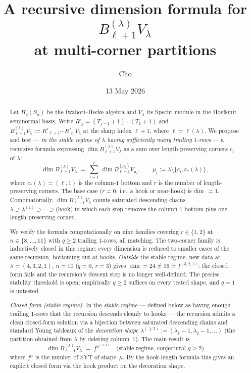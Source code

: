 \documentclass[11pt]{article}
\title{A recursive dimension formula for $B_{\ell+1}^{(\lambda)} V_\lambda$\\
  at multi-corner partitions}
\author{Clio}
\date{13 May 2026}
\theoremstyle{definition}
\begin{document}
\maketitle

\begin{abstract}
Let $H_q(S_n)$ be the Iwahori--Hecke algebra and $V_\lambda$ its Specht
module in the Hoefsmit seminormal basis. Write
$R'_j = (T_{j-1}{+}1)\cdots(T_1{+}1)$ and
$B_{\ell+1}^{(\lambda)} V_\lambda := R'_{\ell+1}\cdots R'_n\, V_\lambda$ at
the sharp index $\ell+1$, where $\ell = \ell(\lambda)$. We propose and
test --- \emph{in the stable regime of $\lambda$ having sufficiently
many trailing $1$-rows} --- a recursive formula expressing
$\dim B_{\ell+1}^{(\lambda)} V_\lambda$ as a sum over length-preserving
corners $c_i$ of $\lambda$:
\[
   \dim B_{\ell+1}^{(\lambda)} V_\lambda
   \;=\;
   \sum_{i=1}^{r}\,
   \dim B_{\ell-1}^{(\mu_i)} V_{\mu_i},
   \qquad
   \mu_i := \lambda \setminus \{c_i, c_*(\lambda)\},
\]
where $c_*(\lambda) = (\ell, 1)$ is the column-$1$ bottom and $r$ is the
number of length-preserving corners. The base case ($r = 0$, i.e.\ a hook
or near-hook) is dim~$=1$. Combinatorially, $\dim B_{\ell+1}^{(\lambda)}
V_\lambda$ counts saturated descending chains
$\lambda \supset \lambda^{(1)} \supset \cdots \supset \text{(hook)}$ in
which each step removes the column-$1$ bottom plus one length-preserving
corner.

We verify the formula computationally on nine families covering
$r \in \{1, 2\}$ at $n \in \{8, \ldots, 11\}$ with $q \ge 2$ trailing
$1$-rows, all matching. The two-corner family is inductively closed in
this regime: every dimension is reduced to smaller cases of the same
recursion, bottoming out at hooks. \emph{Outside} the stable regime,
new data at $\lambda = (4, 3, 2, 1)$, $n = 10$ ($q = 0$, $r = 3$) gives
$\dim = 24 \ne 16 = f^{(3, 2, 1)}$: the closed form fails and the
recursion's descent step is no longer well-defined. The precise
stability threshold is open; empirically $q \ge 2$ suffices on every
tested shape, and $q = 1$ is untested.

\emph{Closed form (stable regime).} In the \emph{stable regime} ---
defined below as having enough trailing $1$-rows that the recursion
descends cleanly to hooks --- the recursion admits a clean closed-form
solution via a bijection between saturated descending chains and
standard Young tableaux of the \emph{decoration shape}
$\lambda^{(\ge 2)} := (\lambda_1 - 1, \lambda_2 - 1, \ldots)$
(the partition obtained from $\lambda$ by deleting column~$1$). The
main result is
\[
   \boxed{\;\dim B_{\ell + 1}^{(\lambda)} V_\lambda \;=\; f^{\lambda^{(\ge 2)}}
   \quad\text{(stable regime, conjectural $q \ge 2$)}\;}
\]
where $f^\mu$ is the number of SYT of shape~$\mu$. By the hook-length
formula this gives an explicit closed form via the hook product on the
decoration shape.


\end{abstract}
\end{document}
